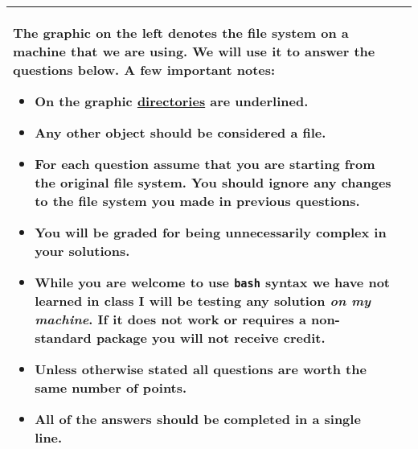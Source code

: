 \documentclass[11pt]{article}
\begin{document}
\begin{table}[h]
\begin{tabular}{|p{}|p{}|}
\begin{minipage}[t]{0.55\textwidth}
The graphic on the left denotes the file system on a machine that we are using. We will use it to answer the questions below. A few important notes:
\begin{itemize}
    \item On the graphic \underline{directories} are underlined.
    \item Any other object should be considered a file.
    \item \textbf{For each question assume that you are starting from the original file system}. You should ignore any changes to the file system you made in previous questions.
    \item You will be graded for being unnecessarily complex in your solutions. 
    \item While you are welcome to use \texttt{bash} syntax we have not learned in class I will be testing any solution \emph{on my machine}. If it does not work or requires a non-standard package you will not receive credit.
    \item Unless otherwise stated all questions are worth the same number of points.
    \item All of the answers should be completed in a single line.
\end{itemize}
\end{minipage}
\\
\hline
\end{tabular}
\end{table}
\end{document}
